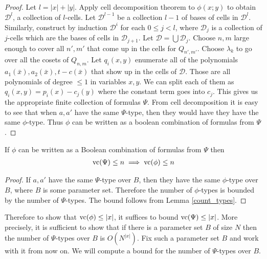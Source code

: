 \documentclass{amsart}
\newcommand{\DD}{\mathscr D}
\begin{document}
\begin{proof}
  Let $l = |x| + |y|$.
  Apply cell decomposition theorem to $\phi(x; y)$ to obtain $\DD^l$, a collection of $l$-cells.
  Let $\DD^{l-1}$ be a collection $l-1$ of bases of cells in $\DD^l$.
  Similarly, construct by induction $\DD^i$ for each $0 \leq j < l$,
  where $\DD_j$ is a collection of $j$-cells which are the bases of cells in $\DD_{j+1}$.
  Let $\DD = \bigcup \DD_j$.
  Choose $n,m$ large enough to cover all $n', m'$ that come up in the cells for $Q_{n',m'}$.
  Choose $\lambda_k$ to go over all the cosets of $Q_{n,m}$.
  Let $q_i(x, y)$ enumerate all of the polynomials $a_1(\bar x), a_2(\bar x), t - c(\bar x)$ that show up in the cells of $\DD$.
  Those are all polynomials of degree $\leq 1$ in variables $x, y$.
  We can split each of them as $q_i(x,y) = p_i(x) - c_j(y)$ where the constant term goes into $c_j$.
  This gives us the appropriate finite collection of formulas $\Psi$.
  From cell decomposition it is easy to see that when $a, a'$ have the same $\Psi$-type,
  then they would have they have the same $\phi$-type.
  Thus $\phi$ can be written as a boolean combination of formulas from $\Psi$.
\end{proof}

\begin{Lemma}
  If $\phi$ can be written as a Boolean combination of formulas from $\Psi$ then
  \begin{align*}
    \operatorname{vc} (\Psi) \leq n \implies \operatorname{vc} (\phi) \leq n
  \end{align*}
\end{Lemma}
\begin{proof}
  If $a,a'$ have the same $\Psi$-type over $B$, then they have the same $\phi$-type over $B$, where $B$ is some parameter set.
  Therefore the number of $\phi$-types is bounded by the number of $\Psi$-types.
  The bound follows from Lemma \ref{count_types}.
\end{proof}

Therefore to show that $\operatorname{vc}(\phi) \leq |x|$, it suffices to bound $\operatorname{vc}(\Psi) \leq |x|$.
More precisely, it is sufficient to show that if there is a parameter set $B$ of size $N$
then the number of $\Psi$-types over $B$ is $O(N^{|x|})$.
Fix such a parameter set $B$ and work with it from now on.
We will compute a bound for the number of $\Psi$-types over $B$.
\end{document}
